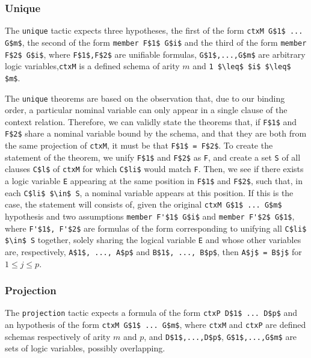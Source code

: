 \documentclass[nocopyrightspace,authoryear]{sigplanconf}
\begin{document}
\subsubsection{Unique}
The \lstinline|unique| tactic expects three hypotheses, the first of the form \lstinline|ctxM G$1$ ... G$m$|, the second of the form \lstinline|member F$1$ G$i$| and the third of the form \lstinline|member F$2$ G$i$|, where \lstinline|F$1$,F$2$| are unifiable formulas, \lstinline|G$1$,...,G$m$| are arbitrary logic variables,\lstinline|ctxM| is a defined schema of arity $m$ and \lstinline|1 $\leq$ $i$ $\leq$ $m$|.

The \lstinline|unique| theorems are based on the observation that, due to our binding order, a particular nominal variable can only appear in a single clause of the context relation. Therefore, we can validly state the theorems that, if \lstinline|F$1$| and \lstinline|F$2$| share a nominal variable bound by the schema, and that they are both from the same projection of \lstinline|ctxM|, it must be that \lstinline|F$1$ = F$2$|. To create the statement of the theorem, we unify \lstinline|F$1$| and \lstinline|F$2$| as \lstinline|F|, and create a set \lstinline|S| of all clauses \lstinline|C$l$| of \lstinline|ctxM| for which \lstinline|C$li$| would match \lstinline|F|. Then, we see if there exists a logic variable \lstinline|E| appearing at the same position in \lstinline|F$1$| and \lstinline|F$2$|, such that, in each \lstinline|C$li$ $\in$ S|, a nominal variable appears at this position. If this is the case, the statement will consists of, given the original \lstinline|ctxM G$1$ ... G$m$| hypothesis and two assumptions \lstinline|member F'$1$ G$i$| and \lstinline|member F'$2$ G$1$|, where \lstinline|F'$1$, F'$2$| are formulas of the form corresponding to unifying all \lstinline|C$li$ $\in$ S| together, solely sharing the logical variable \lstinline|E| and whose other variables are, respectively, \lstinline|A$1$, ..., A$p$| and \lstinline|B$1$, ..., B$p$|, then \lstinline|A$j$ = B$j$| for $1 \leq j \leq p$.



\subsubsection{Projection}
The \lstinline|projection| tactic expects a formula of the form \lstinline|ctxP D$1$ ... D$p$| and an hypothesis of the form \lstinline|ctxM G$1$ ... G$m$|, where \lstinline|ctxM| and \lstinline|ctxP| are defined schemas respectively of arity $m$ and $p$, and \lstinline|D$1$,...,D$p$|, \lstinline|G$1$,...,G$m$| are sets of logic variables, possibly overlapping.
\end{document}
